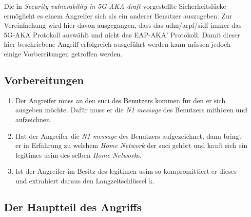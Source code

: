 Die in \textit{Security vulnerability in 5G-AKA draft} vorgestellte Sicherheitslücke ermöglicht es einem Angreifer sich als ein anderer Benutzer auszugeben. %
Zur Vereinfachung wird hier davon ausgegangen, dass das \gls{udm}/\gls{arpf}/\gls{sidf} immer das 5G-AKA Protokoll auswählt und nicht das EAP-AKA' Protokoll.
Damit dieser hier beschriebene Angriff erfolgreich ausgeführt werden kann müssen jedoch einige Vorbereitungen getroffen werden.

\subsection{Vorbereitungen}

\begin{enumerate}
\item Der Angreifer muss an den \gls{suci} des Benutzers kommen für den er sich ausgeben möchte.
Dafür muss er die \textit{N1 message} des Benutzers mithören und aufzeichnen.

\item Hat der Angreifer die \textit{N1 message} des Benutzers aufgezeichnet, dann bringt er in Erfahrung zu welchem \textit{Home Network} der \gls{suci} gehört und kauft sich ein legitimes \gls{usim} des selben \textit{Home Network}s.

\item Ist der Angreifer im Besitz des legitimen \gls{usim} so kompromittiert er dieses und extrahiert daraus den Langzeitschlüssel \gls{k}.

\end{enumerate}

\subsection{Der Hauptteil des Angriffs}

